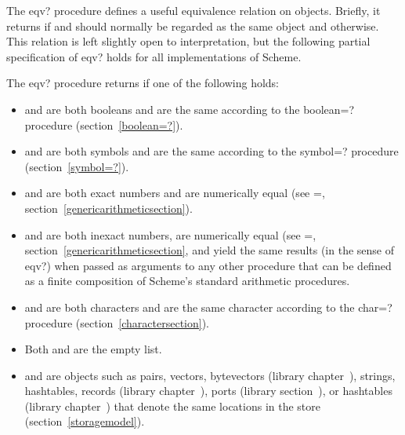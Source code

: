 \begin{entry}{%
}

The {\cf eqv?} procedure defines a useful equivalence relation on objects.
Briefly, it returns \schtrue{} if  and  should
normally be regarded as the same object and \schfalse{} otherwise.  This relation is left slightly
open to interpretation, but the following partial specification of
{\cf eqv?} holds for all implementations of Scheme.

The {\cf eqv?} procedure returns \schtrue{} if one of the following holds:

\begin{itemize}
\item {} and  are both booleans and are the same
  according to the {\cf boolean=?} procedure (section~\ref{boolean=?}).

\item {} and  are both symbols and are the same
  according to the {\cf symbol=?} procedure (section~\ref{symbol=?}).

\item {} and  are both exact numbers
  and are numerically equal (see {\cf =}, 
  section~\ref{genericarithmeticsection}).

\item {} and  are both inexact numbers, are numerically
  equal (see {\cf =}, section~\ref{genericarithmeticsection}, and
  yield the same results (in the sense of {\cf eqv?}) when passed
  as arguments to any other procedure that can be defined
  as a finite composition of Scheme's standard arithmetic
  procedures.

\item {} and  are both characters and are the same
character according to the {\cf char=?} procedure
(section~\ref{charactersection}).

\item Both  and  are the empty list.

\item {} and  are objects such as pairs, vectors, bytevectors
  (library chapter~),
  strings, hashtables, records (library
  chapter~), ports (library
  section~), or hashtables
  (library chapter~) that
  denote the same locations in the store (section~\ref{storagemodel}).


\end{itemize}
\end{entry}
